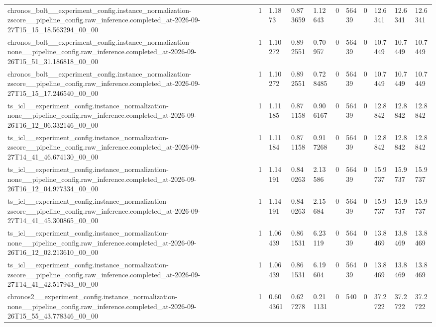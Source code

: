 \begin{tabular}{lllllllllll}
chronos\_bolt\_\_experiment\_config.instance\_normalization-zscore\_\_pipeline\_config.raw\_inference.completed\_at-2026-09-27T15\_15\_18.563294\_00\_00 & 1 & 1.1873 & 0.873659 & 1.12643 & 0 & 56439 & 0 & 12.6341 & 12.6341 & 12.6341 \\
chronos\_bolt\_\_experiment\_config.instance\_normalization-none\_\_pipeline\_config.raw\_inference.completed\_at-2026-09-26T15\_51\_31.186818\_00\_00 & 1 & 1.10272 & 0.892551 & 0.70957 & 0 & 56439 & 0 & 10.7449 & 10.7449 & 10.7449 \\
chronos\_bolt\_\_experiment\_config.instance\_normalization-zscore\_\_pipeline\_config.raw\_inference.completed\_at-2026-09-27T15\_15\_17.246540\_00\_00 & 1 & 1.10272 & 0.892551 & 0.728485 & 0 & 56439 & 0 & 10.7449 & 10.7449 & 10.7449 \\
ts\_icl\_\_experiment\_config.instance\_normalization-none\_\_pipeline\_config.raw\_inference.completed\_at-2026-09-26T16\_12\_06.332146\_00\_00 & 1 & 1.11185 & 0.871158 & 0.906167 & 0 & 56439 & 0 & 12.8842 & 12.8842 & 12.8842 \\
ts\_icl\_\_experiment\_config.instance\_normalization-zscore\_\_pipeline\_config.raw\_inference.completed\_at-2026-09-27T14\_41\_46.674130\_00\_00 & 1 & 1.11184 & 0.871158 & 0.917268 & 0 & 56439 & 0 & 12.8842 & 12.8842 & 12.8842 \\
ts\_icl\_\_experiment\_config.instance\_normalization-none\_\_pipeline\_config.raw\_inference.completed\_at-2026-09-26T16\_12\_04.977334\_00\_00 & 1 & 1.14191 & 0.840263 & 2.13586 & 0 & 56439 & 0 & 15.9737 & 15.9737 & 15.9737 \\
ts\_icl\_\_experiment\_config.instance\_normalization-zscore\_\_pipeline\_config.raw\_inference.completed\_at-2026-09-27T14\_41\_45.300865\_00\_00 & 1 & 1.14191 & 0.840263 & 2.15684 & 0 & 56439 & 0 & 15.9737 & 15.9737 & 15.9737 \\
ts\_icl\_\_experiment\_config.instance\_normalization-none\_\_pipeline\_config.raw\_inference.completed\_at-2026-09-26T16\_12\_02.213610\_00\_00 & 1 & 1.06439 & 0.861531 & 6.23119 & 0 & 56439 & 0 & 13.8469 & 13.8469 & 13.8469 \\
ts\_icl\_\_experiment\_config.instance\_normalization-zscore\_\_pipeline\_config.raw\_inference.completed\_at-2026-09-27T14\_41\_42.517943\_00\_00 & 1 & 1.06439 & 0.861531 & 6.19604 & 0 & 56439 & 0 & 13.8469 & 13.8469 & 13.8469 \\
chronos2\_\_experiment\_config.instance\_normalization-none\_\_pipeline\_config.raw\_inference.completed\_at-2026-09-26T15\_55\_43.778346\_00\_00 & 1 & 0.604361 & 0.627278 & 0.211131 & 0 & 540 & 0 & 37.2722 & 37.2722 & 37.2722 \\

\end{tabular}
